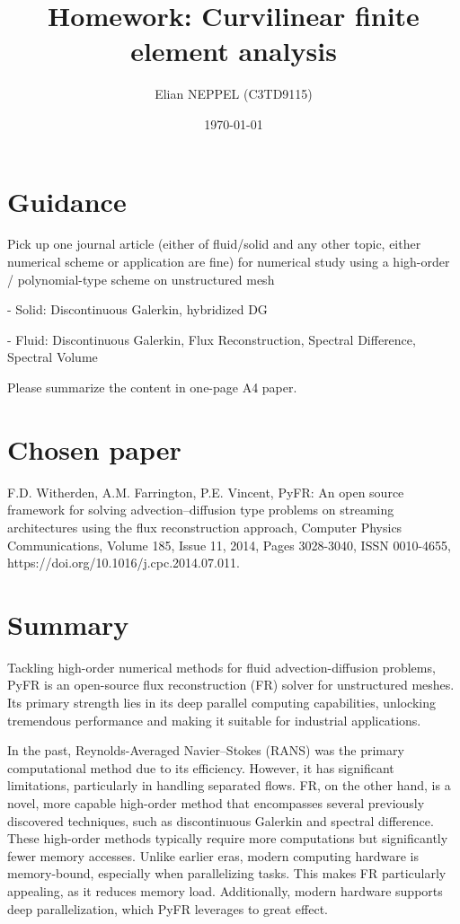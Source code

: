 \documentclass[12pt]{article}
\title{Homework: Curvilinear finite element analysis}
\author{Elian NEPPEL (C3TD9115)}
\date{\today}
\begin{document}
\maketitle

\section*{Guidance}

Pick up one journal article (either of fluid/solid and any other topic, either numerical scheme or application are fine) for numerical study using a high-order / polynomial-type scheme on unstructured mesh

- Solid: Discontinuous Galerkin, hybridized DG

- Fluid: Discontinuous Galerkin, Flux Reconstruction, Spectral Difference, Spectral Volume

Please summarize the content in one-page A4 paper.

\section*{Chosen paper}

F.D. Witherden, A.M. Farrington, P.E. Vincent,
PyFR: An open source framework for solving advection–diffusion type problems on streaming architectures using the flux reconstruction approach,
Computer Physics Communications,
Volume 185, Issue 11,
2014,
Pages 3028-3040,
ISSN 0010-4655,
https://doi.org/10.1016/j.cpc.2014.07.011.

\newpage
\section{Summary}

Tackling high-order numerical methods for fluid advection-diffusion problems, PyFR is an open-source flux reconstruction (FR) solver for unstructured meshes. Its primary strength lies in its deep parallel computing capabilities, unlocking tremendous performance and making it suitable for industrial applications.

In the past, Reynolds-Averaged Navier–Stokes (RANS) was the primary computational method due to its efficiency. However, it has significant limitations, particularly in handling separated flows. FR, on the other hand, is a novel, more capable high-order method that encompasses several previously discovered techniques, such as discontinuous Galerkin and spectral difference. These high-order methods typically require more computations but significantly fewer memory accesses. Unlike earlier eras, modern computing hardware is memory-bound, especially when parallelizing tasks. This makes FR particularly appealing, as it reduces memory load. Additionally, modern hardware supports deep parallelization, which PyFR leverages to great effect.
\end{document}
